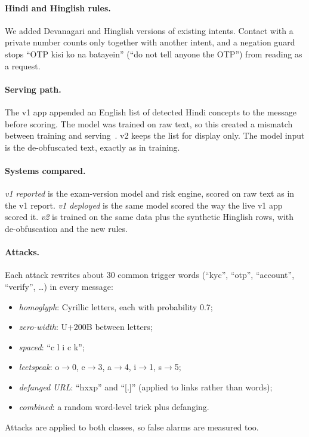 \documentclass[10pt,twocolumn]{article}
\begin{document}
\paragraph{Hindi and Hinglish rules.} We added Devanagari and Hinglish versions of existing intents. Contact with a
private number counts only together with another intent, and a negation guard stops ``OTP kisi ko na batayein''
(``do not tell anyone the OTP'') from reading as a request.

\paragraph{Serving path.} The v1 app appended an English list of detected Hindi concepts to the message before scoring.
The model was trained on raw text, so this created a mismatch between training and serving~\cite{sculley2015}. v2
keeps the list for display only. The model input is the de-obfuscated text, exactly as in training.

\paragraph{Systems compared.} \emph{v1 reported} is the exam-version model and risk engine, scored on raw text as in
the v1 report. \emph{v1 deployed} is the same model scored the way the live v1 app scored it. \emph{v2} is trained on
the same data plus the synthetic Hinglish rows, with de-obfuscation and the new rules.

\paragraph{Attacks.} Each attack rewrites about 30 common trigger words (``kyc'', ``otp'', ``account'',
``verify'', \dots) in every message:
\begin{itemize}\itemsep0pt
\item \emph{homoglyph}: Cyrillic letters, each with probability 0.7;
\item \emph{zero-width}: U+200B between letters;
\item \emph{spaced}: ``c l i c k'';
\item \emph{leetspeak}: o$\to$0, e$\to$3, a$\to$4, i$\to$1, s$\to$5;
\item \emph{defanged URL}: ``hxxp'' and ``[.]'' (applied to links rather than words);
\item \emph{combined}: a random word-level trick plus defanging.
\end{itemize}
Attacks are applied to both classes, so false alarms are measured too.
\end{document}
